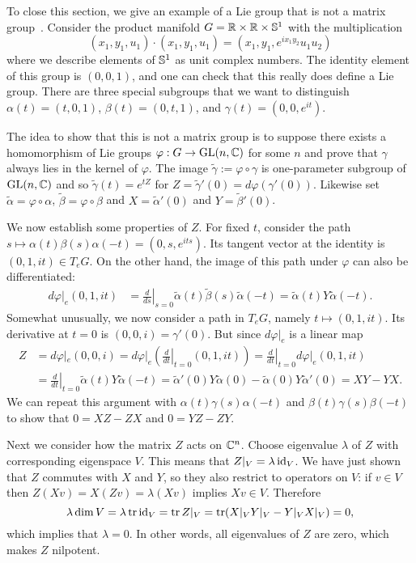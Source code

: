 To close this section, we give an example of a Lie group that is not a matrix group~\cite[Sec~4.8]{Hall2015}.
Consider the product manifold $G = \mathbb{R}\times\mathbb{R}\times\mathbb{S}^1$ with the multiplication
\[
(x_1,y_1,u_1) \cdot (x_1,y_1,u_1) = (x_1,y_1,e^{ix_1y_2} u_1u_2)
\]
where we describe elements of $\mathbb{S}^1$ as unit complex numbers.
The identity element of this group is $(0,0,1)$, and one can check that this really does define a Lie group.
There are three special subgroups that we want to distinguish $\alpha(t) = (t,0,1)$, $\beta(t) = (0,t,1)$, and $\gamma(t) = (0,0,e^{it})$.

The idea to show that this is not a matrix group is to suppose there exists a homomorphism of Lie groups $\varphi : G \to \mathrm{GL}(n,\mathbb{C})$ for some $n$ and prove that $\gamma$ always lies in the kernel of $\varphi$.
The image $\tilde{\gamma} := \varphi\circ\gamma$ is one-parameter subgroup of $\mathrm{GL}(n,\mathbb{C})$ and so $\tilde{\gamma}(t) = e^{tZ}$ for $Z = \tilde{\gamma}'(0) = d\varphi(\gamma'(0))$.
Likewise set $\tilde{\alpha} = \varphi \circ \alpha$, $\tilde{\beta} = \varphi \circ \beta$ and $X = \tilde{\alpha}'(0)$ and $Y = \tilde{\beta}'(0)$.

We now establish some properties of $Z$.
For fixed $t$, consider the path $s \mapsto \alpha(t)\beta(s)\alpha(-t) = (0,s,e^{its})$.
Its tangent vector at the identity is $(0,1,it) \in T_eG$.
On the other hand, the image of this path under $\varphi$ can also be differentiated:
\begin{align*}
d\varphi|_e (0,1,it)
&= \left.\frac{d}{ds}\right|_{s=0} \tilde{\alpha}(t)\tilde{\beta}(s)\tilde{\alpha}(-t) 
= \tilde{\alpha}(t) Y \tilde{\alpha}(-t).
\end{align*}
Somewhat unusually, we now consider a path in $T_eG$, namely $t \mapsto (0,1,it)$.
Its derivative at $t=0$ is $(0,0,i) = \gamma'(0)$.
But since $d\varphi|_e$ is a linear map
\begin{align*}
Z 
&= d\varphi|_e (0,0,i)
= d\varphi|_e \left( \left.\frac{d}{dt}\right|_{t=0} (0,1,it) \right)
= \left.\frac{d}{dt}\right|_{t=0} d\varphi|_e(0,1,it) \\
&= \left.\frac{d}{dt}\right|_{t=0} \tilde{\alpha}(t) Y \tilde{\alpha}(-t)
= \tilde{\alpha}'(0) Y \tilde{\alpha}(0) - \tilde{\alpha}(0) Y \tilde{\alpha}'(0)
= X Y - Y X.
\end{align*}
We can repeat this argument with $\alpha(t)\gamma(s)\alpha(-t)$ and $\beta(t)\gamma(s)\beta(-t)$ to show that $0 = X Z - Z X$ and $0 = Y Z - Z Y$.

Next we consider how the matrix $Z$ acts on $\mathbb{C}^n$.
Choose eigenvalue $\lambda$ of $Z$ with corresponding  eigenspace $V$.
This means that $Z|_V = \lambda \operatorname{id}_V$.
We have just shown that $Z$ commutes with $X$ and $Y$, so they also restrict to operators on $V$: if $v \in V$ then $Z(Xv) = X(Zv) = \lambda (Xv)$ implies $Xv \in V$.
Therefore
\[
\lambda \dim V
= \lambda \operatorname{tr} \operatorname{id}_V 
= \operatorname{tr} Z|_V
= \operatorname{tr} (X|_V Y|_V - Y|_V X|_V)
= 0,
\]
which implies that $\lambda = 0$.
In other words, all eigenvalues of $Z$ are zero, which makes $Z$ nilpotent.

